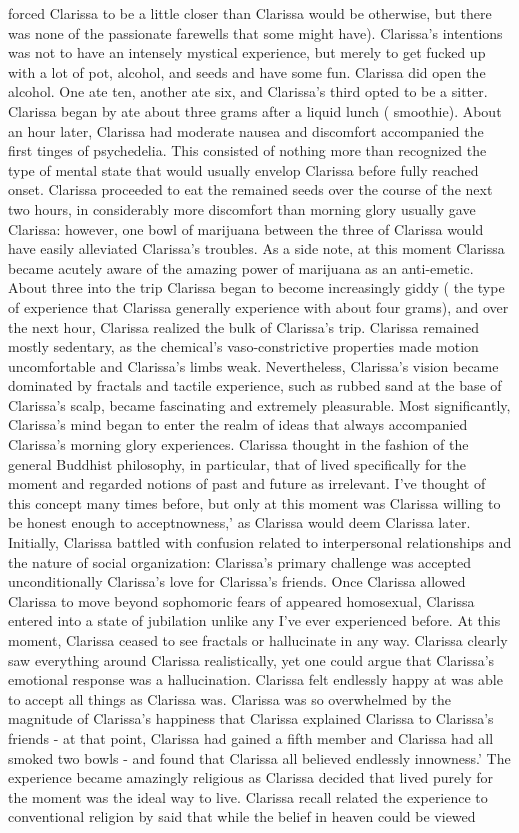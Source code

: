 \documentclass[12pt]{book}
\begin{document}
forced Clarissa to be a little closer than Clarissa would be otherwise, but there was none of the passionate farewells that some might have). Clarissa's intentions was not to have an intensely mystical experience, but merely to get fucked up with a lot of pot, alcohol, and seeds and have some fun. Clarissa did open the alcohol. One ate ten, another ate six, and Clarissa's third opted to be a sitter. Clarissa began by ate about three grams after a liquid lunch ( smoothie). About an hour later, Clarissa had moderate nausea and discomfort accompanied the first tinges of psychedelia. This consisted of nothing more than recognized the type of mental state that would usually envelop Clarissa before fully reached onset. Clarissa proceeded to eat the remained seeds over the course of the next two hours, in considerably more discomfort than morning glory usually gave Clarissa: however, one bowl of marijuana between the three of Clarissa would have easily alleviated Clarissa's troubles. As a side note, at this moment Clarissa became acutely aware of the amazing power of marijuana as an anti-emetic. About three into the trip Clarissa began to become increasingly giddy ( the type of experience that Clarissa generally experience with about four grams), and over the next hour, Clarissa realized the bulk of Clarissa's trip. Clarissa remained mostly sedentary, as the chemical's vaso-constrictive properties made motion uncomfortable and Clarissa's limbs weak. Nevertheless, Clarissa's vision became dominated by fractals and tactile experience, such as rubbed sand at the base of Clarissa's scalp, became fascinating and extremely pleasurable. Most significantly, Clarissa's mind began to enter the realm of ideas that always accompanied Clarissa's morning glory experiences. Clarissa thought in the fashion of the general Buddhist philosophy, in particular, that of lived specifically for the moment and regarded notions of past and future as irrelevant. I've thought of this concept many times before, but only at this moment was Clarissa willing to be honest enough to acceptnowness,' as Clarissa would deem Clarissa later. Initially, Clarissa battled with confusion related to interpersonal relationships and the nature of social organization: Clarissa's primary challenge was accepted unconditionally Clarissa's love for Clarissa's friends. Once Clarissa allowed Clarissa to move beyond sophomoric fears of appeared homosexual, Clarissa entered into a state of jubilation unlike any I've ever experienced before. At this moment, Clarissa ceased to see fractals or hallucinate in any way. Clarissa clearly saw everything around Clarissa realistically, yet one could argue that Clarissa's emotional response was a hallucination. Clarissa felt endlessly happy at was able to accept all things as Clarissa was. Clarissa was so overwhelmed by the magnitude of Clarissa's happiness that Clarissa explained Clarissa to Clarissa's friends - at that point, Clarissa had gained a fifth member and Clarissa had all smoked two bowls - and found that Clarissa all believed endlessly innowness.' The experience became amazingly religious as Clarissa decided that lived purely for the moment was the ideal way to live. Clarissa recall related the experience to conventional religion by said that while the belief in heaven could be viewed 
\end{document}
